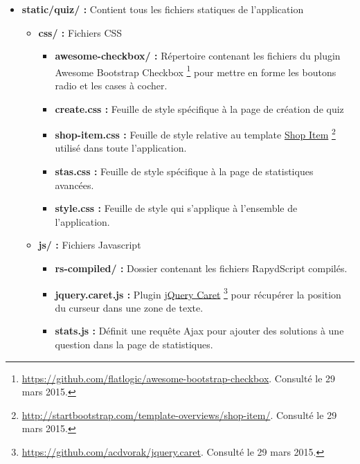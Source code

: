 \documentclass[a4paper,11pt,openany,oneside]{sphinxmanual}
\begin{document}
\begin{itemize}
\begin{itemize}
\end{itemize}

\item {} 
\textbf{static/quiz/ :} Contient tous les fichiers statiques de l'application
\begin{itemize}
\item {} 
\textbf{css/ :} Fichiers CSS
\begin{itemize}
\item {} 
\textbf{awesome-checkbox/ :} Répertoire contenant les fichiers du plugin Awesome Bootstrap Checkbox \footnote{
\href{https://github.com/flatlogic/awesome-bootstrap-checkbox}{https://github.com/flatlogic/awesome-bootstrap-checkbox}. Consulté le 29 mars 2015.
} pour mettre en forme les boutons radio et les cases à cocher.

\item {} 
\textbf{create.css :} Feuille de style spécifique à la page de création de quiz

\item {} 
\textbf{shop-item.css :} Feuille de style relative au template \href{http://startbootstrap.com/template-overviews/shop-item/}{Shop Item} \footnote{
\href{http://startbootstrap.com/template-overviews/shop-item/}{http://startbootstrap.com/template-overviews/shop-item/}. Consulté le 29 mars 2015.
} utilisé dans toute l'application.

\item {} 
\textbf{stas.css :} Feuille de style spécifique à la page de statistiques avancées.

\item {} 
\textbf{style.css :} Feuille de style qui s'applique à l'ensemble de l'application.

\end{itemize}

\item {} 
\textbf{js/ :} Fichiers Javascript
\begin{itemize}
\item {} 
\textbf{rs-compiled/ :} Dossier contenant les fichiers RapydScript compilés.

\item {} 
\textbf{jquery.caret.js :} Plugin \href{https://github.com/acdvorak/jquery.caret}{jQuery Caret} \footnote{
\href{https://github.com/acdvorak/jquery.caret}{https://github.com/acdvorak/jquery.caret}. Consulté le 29 mars 2015.
} pour récupérer la position du curseur dans une zone de texte.

\item {} 
\textbf{stats.js :} Définit une requête Ajax pour ajouter des solutions à une question dans la page de statistiques.


\end{itemize}
\end{itemize}
\end{itemize}
\end{document}
